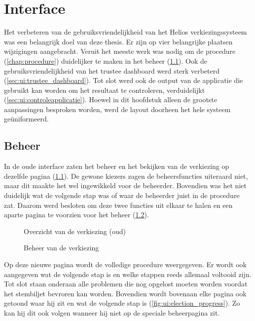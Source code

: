 % 
%

\chapter{Interface}
\label{chap:interface}

Het verbeteren van de gebruiksvriendelijkheid van het Helios verkiezingssysteem was een belangrijk doel van deze thesis. Er zijn op vier belangrijke plaatsen wijzigingen aangebracht. Veruit het meeste werk was nodig om de procedure (\ref{chap:procedure}) duidelijker te maken in het beheer (\ref{sec:ui:beheer}). Ook de gebruiksvriendelijkheid van het trustee dashboard werd sterk verbeterd (\ref{sec:ui:trustee_dashboard}). Tot slot werd ook de output van de applicatie die gebruikt kan worden om het resultaat te controleren, verduidelijkt (\ref{sec:ui:controleapplicatie}). Hoewel in dit hoofdstuk alleen de grootste aanpassingen besproken worden, werd de layout doorheen het hele systeem geüniformeerd.

\section{Beheer}
\label{sec:ui:beheer}

In de oude interface zaten het beheer en het bekijken van de verkiezing op dezelfde pagina (\ref{fig:ui:elections_view_old}). De gewone kiezers zagen de beheersfuncties uiteraard niet, maar dit maakte het wel ingewikkeld voor de beheerder. Bovendien was het niet duidelijk wat de volgende stap was of waar de beheerder juist in de procedure zat. Daarom werd besloten om deze twee functies uit elkaar te halen en een aparte pagina te voorzien voor het beheer (\ref{fig:ui:elections_admin}).

\begin{figure}
  \caption{Overzicht van de verkiezing (oud)}
  \label{fig:ui:elections_view_old}
\end{figure}

\begin{figure}
  \caption{Beheer van de verkiezing}
  \label{fig:ui:elections_admin}
\end{figure}

\npar Op deze nieuwe pagina wordt de volledige procedure weergegeven. Er wordt ook aangegeven wat de volgende stap is en welke stappen reeds allemaal voltooid zijn. Tot slot staan onderaan alle problemen die nog opgelost moeten worden voordat het stembiljet bevroren kan worden. Bovendien wordt bovenaan elke pagina ook getoond waar hij zit en wat de volgende stap is (\ref{fig:ui:election_progress}). Zo kan hij dit ook volgen wanneer hij niet op de speciale beheerpagina zit.

